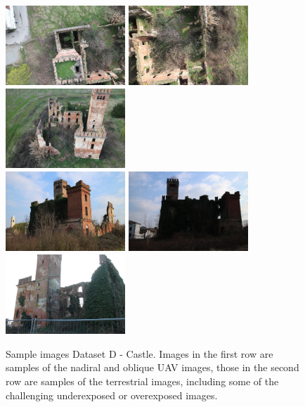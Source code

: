 \begin{figure}
  \centering
    \includegraphics[height=3cm]{castle_img_1}
    \includegraphics[height=3cm]{castle_img_2}
    \includegraphics[height=3cm]{castle_img_3} \\
    \includegraphics[height=3cm]{castle_img_4}
    \includegraphics[height=3cm]{castle_img_5}
    \includegraphics[height=3cm]{castle_img_6}
  \caption{Sample images Dataset D - Castle. Images in the first row are samples of the nadiral and oblique UAV images, those in the second row are samples of the terrestrial images, including some of the challenging underexposed or overexposed images.}
  \label{fig:5:castle_img}
\end{figure}

